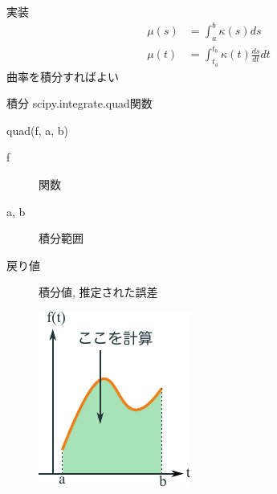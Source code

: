 \documentclass[12pt, xetex, xcolor=pdftex, dvipsnames]{beamer}
\begin{document}
\begin{frame}{実装}
  \begin{align}
      \mu(s) &= \int_a^b \kappa(s)ds\\
      \mu(t) &= \int_{t_a}^{t_b} \kappa(t) \frac{ds}{dt}dt
  \end{align}
  曲率を積分すればよい
\end{frame}
\begin{frame}{積分}
  scipy.integrate.quad関数
  \begin{minipage}{0.5\hsize}
      \begin{block}{quad(f, a, b)}
          \begin{description}
              \item[f] 関数
              \item[a, b] 積分範囲
              \item[戻り値] 積分値, 推定された誤差
          \end{description}
      \end{block}
  \end{minipage}\begin{minipage}{0.5\hsize}
      \begin{figure}
          \centering
          \includegraphics[width=0.8\hsize]{img/integ.pdf}
      \end{figure}
  \end{minipage}
\end{frame}
\end{document}
